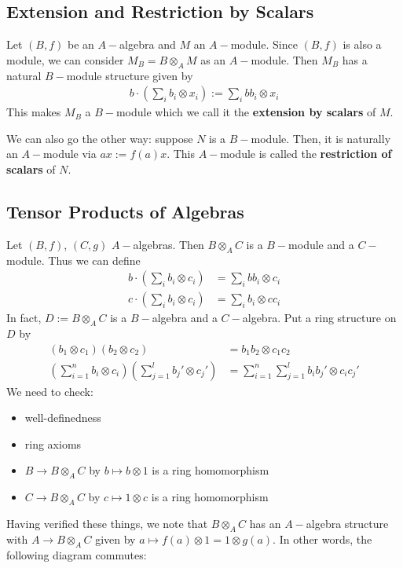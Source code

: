 \documentclass[11pt, a4paper]{memoir}
\theoremstyle{change}
\theoremstyle{plain}
\theoremstyle{nonumberplain}
\DeclareMathOperator{\id}{id}
\numberwithin{equation}{section}
\begin{document}
\subsection{Extension and Restriction by Scalars}
Let $(B,f)$ be an $A-$algebra and $M$ an $A-$module.
Since $(B,f)$ is also a module, we can consider $M_B=B\otimes_A M$ as an $A-$module.
Then $M_B$ has a natural $B-$module structure given by
\begin{align*}
    b\cdot\left(\sum_i b_i\otimes x_i\right):=\sum_i bb_i\otimes x_i
\end{align*}
This makes $M_B$ a $B-$module which we call it the \textbf{extension by scalars} of $M$.

We can also go the other way: suppose $N$ is a $B-$module.
Then, it is naturally an $A-$module via $ax:=f(a)x$.
This $A-$module is called the \textbf{restriction of scalars} of $N$.
\subsection{Tensor Products of Algebras}
Let $(B,f)$, $(C,g)$ $A-$algebras.
Then $B\otimes_A C$ is a $B-$module and a $C-$module.
Thus we can define
\begin{align*}
    b\cdot\left(\sum_i b_i\otimes c_i\right)&=\sum_i bb_i\otimes c_i\\
    c\cdot\left(\sum_i b_i\otimes c_i\right)&=\sum_i b_i\otimes cc_i
\end{align*}
In fact, $D:= B\otimes_A C$ is a $B-$algebra and a $C-$algebra.
Put a ring structure on $D$ by
\begin{align*}
    (b_1\otimes c_1)(b_2\otimes c_2)&=b_1b_2\otimes c_1c_2\\
    \left(\sum_{i=1}^nb_i\otimes c_i\right)\left(\sum_{j=1}^l b_j'\otimes c_j'\right)&=\sum_{i=1}^n\sum_{j=1}^l b_ib_j'\otimes c_ic_j'
\end{align*}
We need to check:
\begin{itemize}[nolistsep]
    \item well-definedness
    \item ring axioms
    \item $B\to B\otimes_A C$ by $b\mapsto b\otimes 1$ is a ring homomorphism
    \item $C\to B\otimes_A C$ by $c\mapsto 1\otimes c$ is a ring homomorphism
\end{itemize}
Having verified these things, we note that $B\otimes_A C$ has an $A-$algebra structure with $A\to B\otimes_A C$ given by $a\mapsto f(a)\otimes 1=1\otimes g(a)$.
In other words, the following diagram commutes:
\begin{center}
\end{center}
\end{document}
